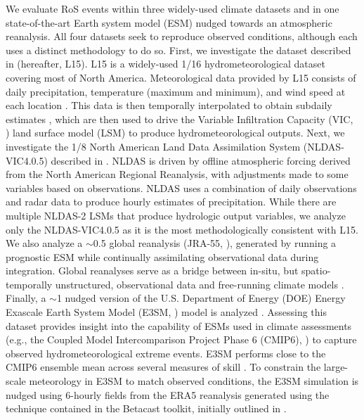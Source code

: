 \documentclass[nhess, manuscript]{copernicus}
\begin{document}
We evaluate RoS events within three widely-used climate datasets and in one state-of-the-art Earth system model (ESM) nudged towards an atmospheric reanalysis.
All four datasets seek to reproduce observed conditions, although each uses a distinct methodology to do so.
First, we investigate the dataset described in \citet{livneh2015spatially} (hereafter, L15).
L15 is a widely-used 1/16\degree{} hydrometeorological dataset covering most of North America.
Meteorological data provided by L15 consists of daily precipitation, temperature (maximum and minimum), and wind speed at each location \citep{henn2018an}.
This data is then temporally interpolated to obtain subdaily estimates \citep{bohn2013global}, which are then used to drive the Variable Infiltration Capacity (VIC, \citet{liang1994simple}) land surface model (LSM) to produce hydrometeorological outputs.
Next, we investigate the 1/8\degree{} North American Land Data Assimilation System (NLDAS-VIC4.0.5)  described in \citet{xia2012continental1}.
NLDAS is driven by offline atmospheric forcing derived from the North American Regional Reanalysis, with adjustments made to some variables based on observations.
NLDAS uses a combination of daily observations and radar data to produce hourly estimates of precipitation.
While there are multiple NLDAS-2 LSMs that produce hydrologic output variables, we analyze only the NLDAS-VIC4.0.5 as it is the most methodologically consistent with L15.
We also analyze a $\sim$0.5\degree{} global reanalysis (JRA-55, \citet{kobayashi2015jra55}), generated by running a prognostic ESM while continually assimilating observational data during integration.
Global reanalyses serve as a bridge between in-situ, but spatio-temporally unstructured, observational data and free-running climate models \citep{parker2016reanalyses}.
Finally, a $\sim$1\degree{} nudged version of the U.S. Department of Energy (DOE) Energy Exascale Earth System Model (E3SM, \citet{golaz2022the}) model is analyzed \citep{zhang2022further}. Assessing this dataset provides insight into the capability of ESMs used in climate assessments (e.g., the Coupled Model Intercomparison Project Phase 6 (CMIP6), \citet{eyring2016overview}) to capture observed hydrometeorological extreme events.
E3SM performs close to the CMIP6 ensemble mean across several measures of skill \citep{Fasullo2020}.
To constrain the large-scale meteorology in E3SM to match observed conditions, the E3SM simulation is nudged using 6-hourly fields from the ERA5 reanalysis \citep{hersbach2020era5} generated using the technique contained in the Betacast toolkit, initially outlined in \citet{zarzycki2015experimental}.
\end{document}
